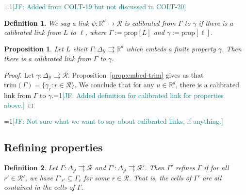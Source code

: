 \documentclass[12pt]{article}
\newcommand{\Comments}{1}
\newcommand{\mynote}[2]{\ifnum\Comments=1\textcolor{#1}{#2}\fi}
\newcommand{\jessie}[1]{\mynote{teal}{[JF: #1]}}
\newcommand{\reals}{\mathbb{R}}
\newcommand{\prop}[1]{\mathrm{prop}[#1]}
\newcommand{\simplex}{\Delta_\Y}
\newcommand{\R}{\mathcal{R}}
\newcommand{\Y}{\mathcal{Y}}
\newcommand{\toto}{\rightrightarrows}
\newcommand{\trim}{\mathrm{trim}}
\newtheorem{proposition}{Proposition}
\newtheorem{definition}{Definition}
\begin{document}
\jessie{Added from COLT-19 but not discussed in COLT-20}

\begin{definition}
	We say a link $\psi:\reals^d \to \R$ is \emph{calibrated from $\Gamma$ to $\gamma$} if there is a calibrated link from $L$ to $\ell$, where $\Gamma := \prop{L}$ and $\gamma:= \prop{\ell}$.
\end{definition}

\begin{proposition}
	Let $L$ elicit $\Gamma:\simplex \toto \reals^d$ which embeds a finite property $\gamma$.
	Then there is a calibrated link from $\Gamma$ to $\gamma$.
\end{proposition}
\begin{proof}
	Let $\gamma: \simplex \toto \R$.
	Proposition~\ref{prop:embed-trim} gives us that $\trim(\Gamma) = \{\gamma_r : r \in \R\}$.
	We conclude that for any $u \in \reals^d$, there is a calibrated link from $\Gamma$ to $\gamma$.\jessie{Added definition for calibrated link for properties above.}
\end{proof}
\jessie{Not sure what we want to say about calibrated links, if anything.}

\subsection{Refining properties}

\begin{definition}
	Let $\Gamma:\simplex \toto \R$ and $\Gamma':\simplex\toto \R'$.
	Then $\Gamma'$ \emph{refines} $\Gamma$ if for all $r' \in \R'$, we have $\Gamma'_{r'} \subseteq \Gamma_r$ for some $r \in \R$.
	That is, the cells of $\Gamma'$ are all contained in the cells of $\Gamma$.
\end{definition}
\end{document}

